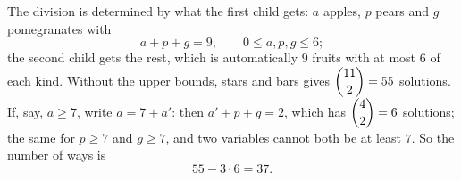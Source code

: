 The division is determined by what the first child gets: $a$ apples, $p$ pears and $g$ pomegranates with
\[
a+p+g=9,\qquad 0\le a,p,g\le6 ;
\]
the second child gets the rest, which is automatically $9$ fruits with at most $6$ of each kind. Without the upper bounds, stars and bars gives $\dbinom{11}{2}=55$ solutions. If, say, $a\ge7$, write $a=7+a'$: then $a'+p+g=2$, which has $\dbinom{4}{2}=6$ solutions; the same for $p\ge7$ and $g\ge7$, and two variables cannot both be at least $7$. So the number of ways is
\[
55-3\cdot6=\boxed{37}.
\]
